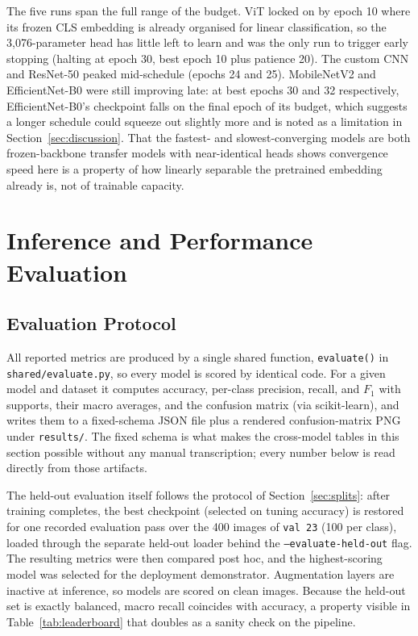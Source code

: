 \documentclass[11pt,twoside,a4paper]{article}
\begin{document}
The five runs span the full range of the budget. ViT locked on by epoch 10 where its frozen CLS embedding is already organised for linear classification,
so the 3,076-parameter head has little left to learn and was the only run
to trigger early stopping (halting at epoch 30, best epoch 10 plus
patience 20). The custom CNN and ResNet-50 peaked mid-schedule (epochs 24
and 25). MobileNetV2 and EfficientNet-B0 were still improving late: at best
epochs 30 and 32 respectively, EfficientNet-B0's checkpoint falls on the
final epoch of its budget, which suggests a longer schedule could squeeze
out slightly more and is noted as a limitation in
Section~\ref{sec:discussion}. That the fastest- and slowest-converging
models are both frozen-backbone transfer models with near-identical heads
shows convergence speed here is a property of how linearly separable the
pretrained embedding already is, not of trainable capacity.

\section{Inference and Performance Evaluation}
\subsection{Evaluation Protocol}

All reported metrics are produced by a single shared function,
\texttt{evaluate()} in \texttt{shared/evaluate.py}, so every model is scored
by identical code. For a given model and dataset it computes accuracy,
per-class precision, recall, and $F_1$ with supports, their macro averages,
and the confusion matrix (via scikit-learn), and writes them to a
fixed-schema JSON file plus a rendered confusion-matrix PNG under
\texttt{results/}. The fixed schema is what makes the cross-model tables in
this section possible without any manual transcription; every number below
is read directly from those artifacts.

The held-out evaluation itself follows the protocol of
Section~\ref{sec:splits}: after training completes, the best checkpoint
(selected on tuning accuracy) is restored for one recorded evaluation pass over
the 400 images of \texttt{val 23} (100 per class), loaded through the separate
held-out loader behind the \texttt{--evaluate-held-out} flag. The resulting
metrics were then compared post hoc, and the highest-scoring model was selected
for the deployment demonstrator. Augmentation
layers are inactive at inference, so models are scored on clean images.
Because the held-out set is exactly balanced, macro recall coincides with
accuracy, a property visible in Table~\ref{tab:leaderboard} that doubles
as a sanity check on the pipeline.
\end{document}
